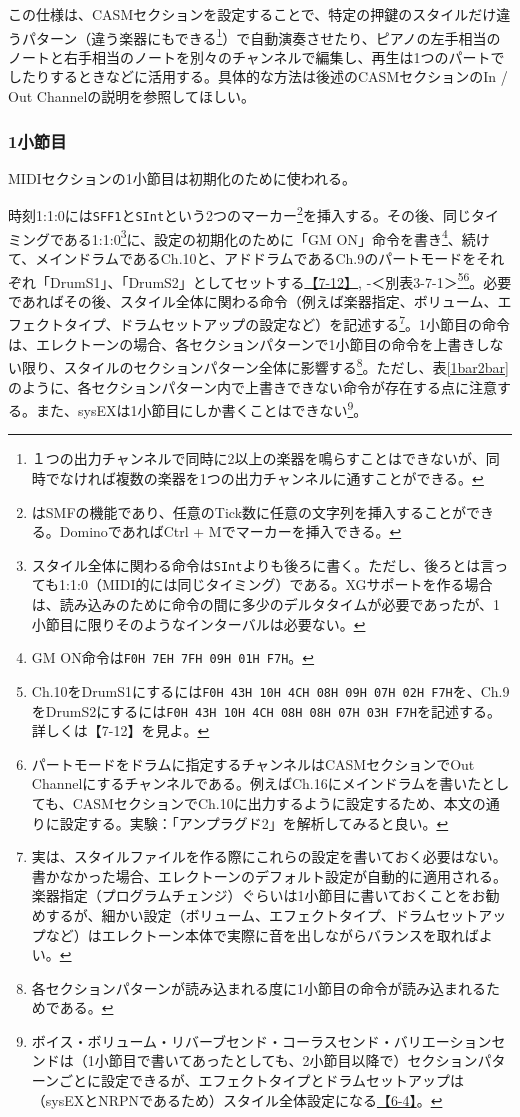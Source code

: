 \documentclass[uplatex, 10pt, dvipdfmx]{jsarticle}
\numberwithin{equation}{section}
\newcommand{\emphj}[1]{\textbf{\textrm{\textgt{{#1}}}}}
\begin{document}
この仕様は、CASMセクションを設定することで、特定の押鍵のスタイルだけ違うパターン（違う楽器にもできる\footnote{１つの出力チャンネルで同時に2以上の楽器を鳴らすことはできないが、同時でなければ複数の楽器を1つの出力チャンネルに通すことができる。}）で自動演奏させたり、ピアノの左手相当のノートと右手相当のノートを別々のチャンネルで編集し、再生は1つのパートでしたりするときなどに活用する。具体的な方法は後述のCASMセクションのIn / Out Channelの説明を参照してほしい。

\subsubsection{1小節目}
MIDIセクションの1小節目は初期化のために使われる。

時刻1:1:0には\texttt{SFF1}と\texttt{SInt}という2つのマーカー\footnote{\emphj{マーカー}はSMFの機能であり、任意のTick数に任意の文字列を挿入することができる。DominoであればCtrl + Mでマーカーを挿入できる。}を挿入する。その後、同じタイミングである1:1:0\footnote{スタイル全体に関わる命令は\texttt{SInt}よりも後ろに書く。ただし、後ろとは言っても1:1:0（MIDI的には同じタイミング）である。XGサポートを作る場合は、読み込みのために命令の間に多少のデルタタイムが必要であったが、1小節目に限りそのようなインターバルは必要ない。}に、設定の初期化のために「GM ON」命令を書き\footnote{GM ON命令は\texttt{F0H 7EH 7FH 09H 01H F7H}。}、続けて、メインドラムであるCh.10と、アドドラムであるCh.9のパートモードをそれぞれ「DrumS1」、「DrumS2」としてセットする\href{http://els01stylefile.music.coocan.jp/Stagea_Style/Stagea_Style_P0712.htm}{【7-12】}, \cite{XG仕様}-＜別表3-7-1＞\footnote{Ch.10をDrumS1にするには\texttt{F0H 43H 10H 4CH 08H 09H 07H 02H F7H}を、Ch.9をDrumS2にするには\texttt{F0H 43H 10H 4CH 08H 08H 07H 03H F7H}を記述する。詳しくは【7-12】を見よ。}\footnote{パートモードをドラムに指定するチャンネルはCASMセクションでOut Channelにするチャンネルである。例えばCh.16にメインドラムを書いたとしても、CASMセクションでCh.10に出力するように設定するため、本文の通りに設定する。実験：「アンプラグド2」を解析してみると良い。}。必要であればその後、スタイル全体に関わる命令（例えば楽器指定、ボリューム、エフェクトタイプ、ドラムセットアップの設定など）を記述する\footnote{実は、スタイルファイルを作る際にこれらの設定を書いておく必要はない。書かなかった場合、エレクトーンのデフォルト設定が自動的に適用される。楽器指定（プログラムチェンジ）ぐらいは1小節目に書いておくことをお勧めするが、細かい設定（ボリューム、エフェクトタイプ、ドラムセットアップなど）はエレクトーン本体で実際に音を出しながらバランスを取ればよい。}。1小節目の命令は、エレクトーンの場合、各セクションパターンで1小節目の命令を上書きしない限り、スタイルのセクションパターン全体に影響する\footnote{各セクションパターンが読み込まれる度に1小節目の命令が読み込まれるためである。}。ただし、表\ref{1bar2bar}のように、各セクションパターン内で上書きできない命令が存在する点に注意する。また、sysEXは1小節目にしか書くことはできない\footnote{ボイス・ボリューム・リバーブセンド・コーラスセンド・バリエーションセンドは（1小節目で書いてあったとしても、2小節目以降で）セクションパターンごとに設定できるが、エフェクトタイプとドラムセットアップは（sysEXとNRPNであるため）スタイル全体設定になる\href{http://els01stylefile.music.coocan.jp/Stagea_Style/P0604.htm}{【6-4】}。}。
\end{document}
